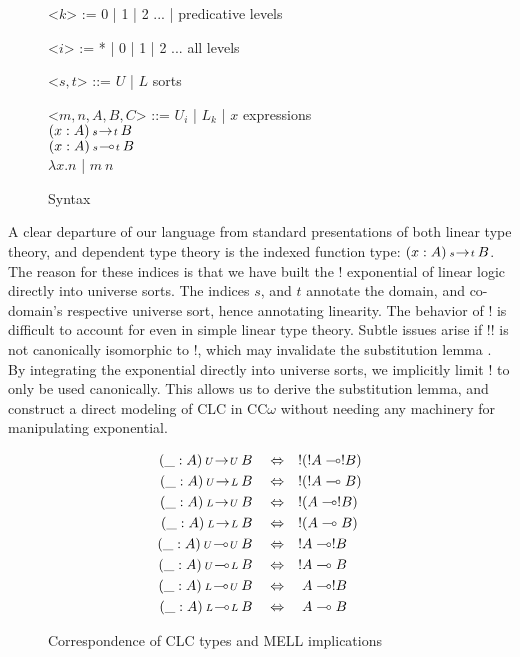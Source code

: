\documentclass{article}
\theoremstyle{definition}
\newcommand{\indalt}[1][2]{\\\hspace*{-1.2em}\textbar\quad}
\newcommand{\arw}[2]
{\hspace*{0.2em}{\scriptstyle #1}\hspace*{-0.2em}
\rightarrow
\hspace*{-0.2em}{\scriptstyle #2}\hspace*{0.2em}}
\newcommand{\lrw}[2]
{\hspace*{0.2em}{\scriptstyle #1}\hspace*{-0.2em}
\multimap
\hspace*{-0.2em}{\scriptstyle #2}\hspace*{0.2em}}
\begin{document}
  \begin{figure}[H]
    \caption{Syntax}
    \centering
    \begin{minipage}{0.8\linewidth}
    \begin{grammar}
      <$k$> := 0 | 1 | 2 ... | \phantom{*} \hspace*{5.8em} predicative levels

      <$i$> := * | 0 | 1 | 2 ... \hspace*{5.8em} all levels

      <$s, t$> ::= $U$ | $L$ \phantom{| $x$} \hspace*{8em} sorts

      <$m, n, A, B, C$> ::= $U_i$ | $L_k$ | $x$ \hspace*{7.3em} expressions
      \indalt $(x : A) \arw{s}{t} B$
      \indalt $(x : A) \lrw{s}{t} B$
      \indalt $\lambda x. n$ | $m\ n$
    \end{grammar}
    \end{minipage}
    \label{syntax}
  \end{figure}
  A clear departure of our language from standard presentations of both linear type theory, and dependent type theory is the indexed function type: $(x : A) \arw{s}{t} B$. The reason for these indices is that we have built the ! exponential of linear logic directly into universe sorts. The indices $s$, and $t$ annotate the domain, and co-domain's respective universe sort, hence annotating linearity. The behavior of ! is difficult to account for even in simple linear type theory. Subtle issues arise if !! is not canonically isomorphic to !, which may invalidate the substitution lemma \cite{substitute}. By integrating the exponential directly into universe sorts, we implicitly limit ! to only be used canonically. This allows us to derive the substitution lemma, and construct a direct modeling of CLC in CC$\omega$ without needing any machinery for manipulating exponential.
  \begin{figure}[H]
    \caption{Correspondence of CLC types and MELL implications}
    \begin{align}
      (\_ : A) \arw{U}{U} B \quad &\Leftrightarrow \quad !(!A \multimap !B) \\
      (\_ : A) \arw{U}{L} B \quad &\Leftrightarrow \quad !(!A \multimap B) \\
      (\_ : A) \arw{L}{U} B \quad &\Leftrightarrow \quad !(A \multimap !B) \\
      (\_ : A) \arw{L}{L} B \quad &\Leftrightarrow \quad !(A \multimap B) \\
      (\_ : A) \lrw{U}{U} B \quad &\Leftrightarrow \quad !A \multimap !B \\
      (\_ : A) \lrw{U}{L} B \quad &\Leftrightarrow \quad !A \multimap B \\
      (\_ : A) \lrw{L}{U} B \quad &\Leftrightarrow \quad A \multimap !B \\
      (\_ : A) \lrw{L}{L} B \quad &\Leftrightarrow \quad A \multimap B
    \end{align}
    \label{correspondence}
  \end{figure}
\end{document}

